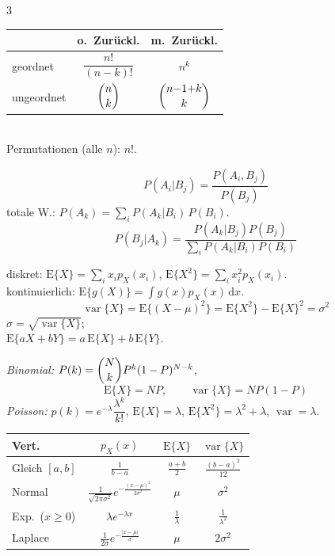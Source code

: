 \begin{multicols}{3}
\renewcommand{\arraystretch}{1.9}
\begin{tabular}{@{}p{1.5cm}cc@{}}
  \toprule
   & \scriptsize o.\ Zurückl. & \scriptsize m.\ Zurückl. \\
  \midrule
  \scriptsize geordnet   & $\dfrac{n!}{(n-k)!}$ & $n^k$ \\
  \scriptsize ungeordnet & $\dbinom{n}{k}$      & $\dbinom{n{-}1{+}k}{k}$ \\
  \bottomrule
\end{tabular}
\renewcommand{\arraystretch}{1}\\[0.2em]
Permutationen (alle $n$): $n!$.

\[ P(A_i|B_j)=\frac{P(A_i,B_j)}{P(B_j)} \]
totale W.: $P(A_k)=\sum_{i} P(A_k|B_i)\,P(B_i)$.
\[ P(B_j|A_k)=\frac{P(A_k|B_j)P(B_j)}{\sum_{i} P(A_k|B_i)P(B_i)} \]

diskret: $\mathrm E\{X\}=\sum_i x_i p_X(x_i)$, $\mathrm E\{X^2\}=\sum_i x_i^2 p_X(x_i)$.\\
kontinuierlich: $\mathrm E\{g(X)\}=\int g(x)p_X(x)\,\mathrm dx$.
\[ \operatorname{var}\{X\}=\mathrm E\{(X-\mu)^2\}=\mathrm E\{X^2\}-\mathrm E\{X\}^2=\sigma^2 \]
$\sigma=\sqrt{\operatorname{var}\{X\}}$;\\
$\mathrm E\{aX{+}bY\}=a\,\mathrm E\{X\}+b\,\mathrm E\{Y\}$.

\emph{Binomial:} $P(k)=\dbinom{N}{k}P^k(1-P)^{N-k}$,
\[ \mathrm E\{X\}=NP,\qquad \operatorname{var}\{X\}=NP(1-P) \]
\emph{Poisson:} $p(k)=e^{-\lambda}\dfrac{\lambda^k}{k!}$,\;
$\mathrm E\{X\}=\lambda$, $\mathrm E\{X^2\}=\lambda^2+\lambda$, $\operatorname{var}=\lambda$.

{\scriptsize
\renewcommand{\arraystretch}{2.1}
\begin{tabular}{@{}p{1.15cm}ccc@{}}
  \toprule
  Vert. & $p_X(x)$ & $\mathrm E\{X\}$ & $\operatorname{var}\{X\}$ \\
  \midrule
  Gleich $[a,b]$ & $\tfrac{1}{b-a}$ & $\tfrac{a+b}{2}$ & $\tfrac{(b-a)^2}{12}$ \\
  Normal & $\tfrac{1}{\sqrt{2\pi\sigma^2}}e^{-\frac{(x-\mu)^2}{2\sigma^2}}$ & $\mu$ & $\sigma^2$ \\
  Exp.\ ($x{\ge}0$) & $\lambda e^{-\lambda x}$ & $\tfrac{1}{\lambda}$ & $\tfrac{1}{\lambda^2}$ \\
  Laplace & $\tfrac{1}{2\sigma}e^{-\frac{|x-\mu|}{\sigma}}$ & $\mu$ & $2\sigma^2$ \\
  \bottomrule
\end{tabular}
\renewcommand{\arraystretch}{1}}


\end{multicols}
